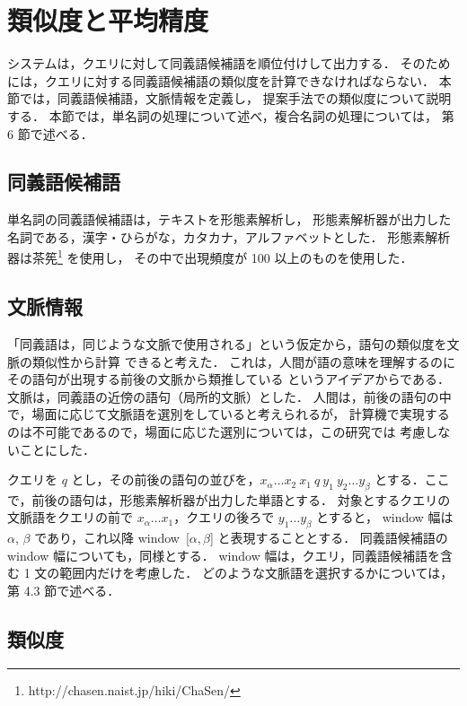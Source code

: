 \documentclass[japanese]{jnlp_1.4}
\begin{document}
\section{類似度と平均精度}

システムは，クエリに対して同義語候補語を順位付けして出力する．
そのためには，クエリに対する同義語候補語の類似度を計算できなければならない．
本節では，同義語候補語，文脈情報を定義し，
提案手法での類似度について説明する．
本節では，単名詞の処理について述べ，複合名詞の処理については，
第 6 節で述べる．



\subsection{同義語候補語}

単名詞の同義語候補語は，テキストを形態素解析し，
形態素解析器が出力した名詞である，漢字・ひらがな，カタカナ，アルファベットとした．
形態素解析器は茶筅\footnote{
	http://chasen.naist.jp/hiki/ChaSen/
} を使用し，
その中で出現頻度が 100 以上のものを使用した．




\subsection{文脈情報}

「同義語は，同じような文脈で使用される」という仮定から，語句の類似度を文脈の類似性から計算
できると考えた．
これは，人間が語の意味を理解するのにその語句が出現する前後の文脈から類推している
というアイデアからである．
文脈は，同義語の近傍の語句（局所的文脈）とした．
人間は，前後の語句の中で，場面に応じて文脈語を選別をしていると考えられるが，
計算機で実現するのは不可能であるので，場面に応じた選別については，この研究では
考慮しないことにした．

クエリを $q$ とし，その前後の語句の並びを，$x_{\alpha} \ldots x_{2}\ x_{1}\ q\ y_{1}\ y_{2} \ldots y_{\beta}$ とする．ここで，前後の語句は，形態素解析器が出力した単語とする．
対象とするクエリの文脈語をクエリの前で $x_{\alpha} \ldots x_{1}$，クエリの後ろで $y_{1} \ldots y_{\beta}$ とすると，
window 幅は $\alpha$, $\beta$ であり，これ以降 window~[$\alpha,\beta$] と表現することとする．
同義語候補語の window 幅についても，同様とする．
window 幅は，クエリ，同義語候補語を含む 1 文の範囲内だけを考慮した．
どのような文脈語を選択するかについては，第 4.3 節で述べる．



\subsection{類似度}
\end{document}
